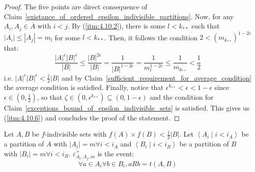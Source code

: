         \begin{proof}
            The five points are direct consequence of Claim~\ref{existance_of_ordered_epsilon_indivisible_partitions}.
            Now, for any $A_i, A_j \in \overline{A}$ with $i < j$.
            By (\ref{itm:4.10.2}), there is some $l < k_{**}$ such that $|A_i| \leq |A_j| = m_l$ for some $l < k_{**}$.
            Then, it follows the condition $2 < (m_{k_{**}})^{1-2\epsilon}$ that:
            \[
                \frac{|A|^\epsilon |B|^\epsilon}{|B|}
                    \leq \frac{|B|^{2\epsilon}}{|B|}
                    = \frac{1}{|B|^{1-2\epsilon}}
                    = \frac{1}{m_l^{1-2\epsilon}}
                    \leq \frac{1}{m_{k_{**}}}
                    < \frac{1}{2}
            \]
            i.e. $|A|^\epsilon |B|^\epsilon < \frac{1}{2} |B|$ and by Claim~\ref{sufficient_requirement_for_average_condition}
                the average condition is satisfied.
            Finally, notice that $\epsilon^{k_{**}} < \epsilon < 1 - \epsilon$ since $\epsilon \in (0, \frac{1}{2})$,
                so that $\zeta \in (0, \epsilon ^ {k_{**}}) \subseteq (0, 1 - \epsilon)$ and the condition for
                Claim~\ref{exceptions_bound_of_epsilon_indivisible_sets} is satisfied.
            This gives us (\ref{itm:4.10.6}) and concludes the proof of the statement.
        \end{proof}

    Let $A, B$ be $f$-indivisible sets with $f(A) \times f(B) < \frac{1}{2} |B|$.
    Let $\left< A_i \mid i < i_A \right>$ be a partition of $A$ with $|A_i| = m \forall i<i_A$ and
        $\left< B_i \mid i < i_B \right>$ be a partition of $B$ with $|B_i| = m \forall i<i_B$.
    $\varepsilon^+_{A_i,A_j,m}$ is the event:
    \[
        \forall a \in A_i \forall b \in B_i, a R b = t(A,B)
    \]

